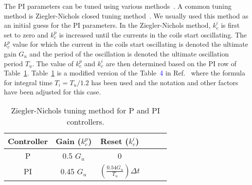 The PI parameters can be tuned using various methods~\cite{tuning}. A common tuning method is Ziegler-Nichols closed tuning method~\cite{tuning_ZN}. We usually used this method as an initial guess for the PI parameters. In the Ziegler-Nichols method, $k_c^i$ is first set to zero and $k_c^p$ is increased until the currents in the coils start oscillating. The $k_c^p$ value for which the current in the coils start oscillating is denoted the ultimate gain $G_{u}$ and the period of the oscillation is denoted the ultimate oscillation period $T_u$. The value of $k_c^p$ and $k_c^i$ are then determined based on the PI row of Table~\ref{table:tuning}. Table~\ref{table:tuning} is a modified version of the Table~\textcolor{blue}{4} in Ref.~\cite{tuning_formula} where the formula for integral time $T_i=T_u/1.2$ has been used and the notation and other factors have been adjusted for this case.


\begin{table} [htb!]
    \centering
    \begin{tabular} { |c|c|c|c|c|c|} 
        \hline
        Controller & Gain ($k_c^p$) & Reset ($k_c^i$)\\
        \hline\hline
         P & 0.5 $G_u$ & 0 \\ 
        \hline
         PI & 0.45 $G_u$ & $\left(\frac{\text{0.54} G_u}{T_u}\right)\Delta t$ \\ 
        \hline
    \end{tabular}
    \caption{Ziegler-Nichols tuning method for P and PI controllers.}\label{table:tuning}
\end{table}


